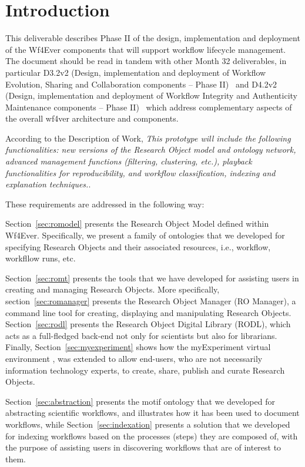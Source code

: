 \section{Introduction}

This deliverable describes Phase II of the design, implementation and
deployment of the Wf4Ever components that will support workflow
lifecycle management. The document should be read in tandem with other
Month 32 deliverables, in particular D3.2v2 (Design, implementation
and deployment of Workflow Evolution, Sharing and Collaboration
components -- Phase II)~\cite{D3.2v2} and D4.2v2 (Design,
implementation and deployment of Workflow Integrity and Authenticity
Maintenance components -- Phase II)~\cite{D4.2v2} which address
complementary aspects of the overall wf4ver architecture and
components.

According to the Description of Work, \emph{This prototype will include the following functionalities: new versions of the Research Object model and ontology network, advanced management functions (filtering, clustering, etc.), playback functionalities for reproducibility, and workflow classification, indexing and explanation techniques.}. 

These requirements are addressed in the following way:

Section~\ref{sec:romodel} presents the Research Object Model defined within Wf4Ever. Specifically, we present a family of ontologies that we developed for specifying Research Objects and their associated resources, i.e., workflow, workfllow runs, etc. 

Section~\ref{sec:romt} presents the tools that we have developed for assisting users in creating and managing Research Objects. More specifically, section~\ref{sec:romanager} presents the Research Object Manager (RO Manager), a command line tool for creating, displaying and manipulating Research Objects. Section~\ref{sec:rodl} presents the Research Object Digital Library (RODL), which acts as a full-fledged back-end not only for scientists but also for librarians. Finally, Section~\ref{sec:myexperiment} shows how the myExperiment virtual environment \cite{DBLP:journals/fgcs/RoureGS09}, was extended to allow end-users, who are not necessarily information technology experts, to create, share, publish and curate Research Objects.

Section~\ref{sec:abstraction} presents the motif ontology that we developed for abstracting scientific workflows, and illustrates how it has been used to document workflows, while Section~\ref{sec:indexation} presents a solution that we developed for indexing workflows based on the processes (steps) they are composed of, with the purpose of assisting users in discovering workflows that are of interest to them. 
